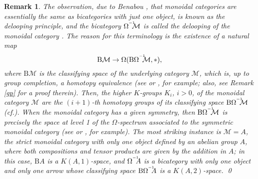 \documentclass[]{amsart}
\newtheorem{remark}[theorem]{Remark}
\begin{document}
\begin{remark}
{The observation, due to Benabou \cite{benabou}, that monoidal categories are essentially the same
as bicategories with just one object, is known as the {\em delooping principle}, and the bicategory
$\Omega^{^{-1}}\hspace{-5pt}{\ensuremath{\mathcal{M}}}$ is called the {\em delooping of the monoidal category}
\cite[2.10]{k-v}. The reason for this terminology  is the existence of a natural map $${\ensuremath{\mathrm{B}}} {\ensuremath{\mathcal{M}}}\to
\Omega({\ensuremath{\mathrm{B}}}\Omega^{^{-1}}\hspace{-5pt}{\ensuremath{\mathcal{M}}},*),$$  where ${\ensuremath{\mathrm{B}}}{\ensuremath{\mathcal{M}}}$ is the classifying space of the
underlying category ${\ensuremath{\mathcal{M}}}$, which is, up to group completion, a homotopy equivalence (see
\cite[Propositions 3.5 and 3.8]{jardine} or \cite[Corollary 4]{b-c2}, for example; also, see Remark
\ref{gp} for a proof therein). Then, the higher $K$-groups $K_i$, $i>0$, of the monoidal category
${\ensuremath{\mathcal{M}}}$ are the $(i+1)$-th homotopy groups of its classifying space ${\ensuremath{\mathrm{B}}}
\Omega^{^{-1}}\hspace{-5pt}{\ensuremath{\mathcal{M}}}$ (cf.\cite{segal74}). When the monoidal category has a given
symmetry, then ${\ensuremath{\mathrm{B}}} \Omega^{^{-1}}\hspace{-5pt}{\ensuremath{\mathcal{M}}}$ is precisely the space at level 1 of the
$\Omega$-spectrum associated to the symmetric monoidal category (see \cite[4.2.2]{thomason} or
\cite[3.12]{jardine}, for example). The most striking instance is ${\ensuremath{\mathcal{M}}}=A$, the strict monoidal
category with only one object defined by an abelian group $A$, where both compositions and tensor
products are given by the addition in $A$; in this case, ${\ensuremath{\mathrm{B}}} A$ is a $K(A,1)$-space, and
$\Omega^{^{-1}}\hspace{-5pt} A$ is a bicategory with only one object and only one arrow whose
classifying space ${\ensuremath{\mathrm{B}}}\Omega^{^{-1}}\hspace{-5pt}A$ is a $K(A,2)$-space. \qed}
\end{remark}
\end{document}

